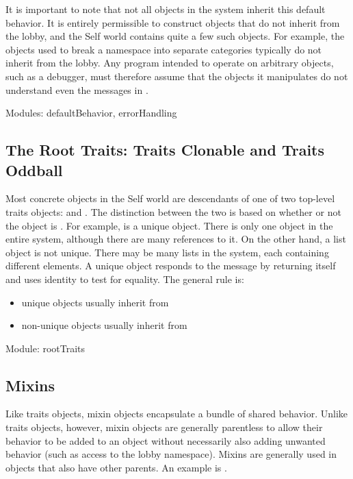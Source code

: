 \documentclass[letterpaper,10pt,english]{sphinxmanual}
\begin{document}
It is important to note that not all objects in the system inherit this default behavior. It is entirely
permissible to construct objects that do not inherit from the lobby, and the Self world contains
quite a few such objects. For example, the objects used to break a namespace into separate categories
typically do not inherit from the lobby. Any program intended to operate on arbitrary objects,
such as a debugger, must therefore assume that the objects it manipulates do not understand even
the messages in .

Modules: defaultBehavior, errorHandling


\subsection{The Root Traits: Traits Clonable and Traits Oddball}
\label{\detokenize{roots:the-root-traits-traits-clonable-and-traits-oddball}}
Most concrete objects in the Self world are descendants of one of two top-level traits objects:
 and . The distinction between the two is based on whether
or not the object is . For example,  is a unique object. There is only one  object in
the entire system, although there are many references to it. On the other hand, a list object is not
unique. There may be many lists in the system, each containing different elements. A unique object
responds to the message  by returning itself and uses identity to test for equality. The general
rule is:
\begin{itemize}
\item {} 
unique objects usually inherit from 

\item {} 
non-unique objects usually inherit from 

\end{itemize}

Module: rootTraits


\subsection{Mixins}
\label{\detokenize{roots:mixins}}
Like traits objects, mixin objects encapsulate a bundle of shared behavior. Unlike traits objects,
however, mixin objects are generally parentless to allow their behavior to be added to an object
without necessarily also adding unwanted behavior (such as access to the lobby namespace). Mixins
are generally used in objects that also have other parents. An example is .
\end{document}
